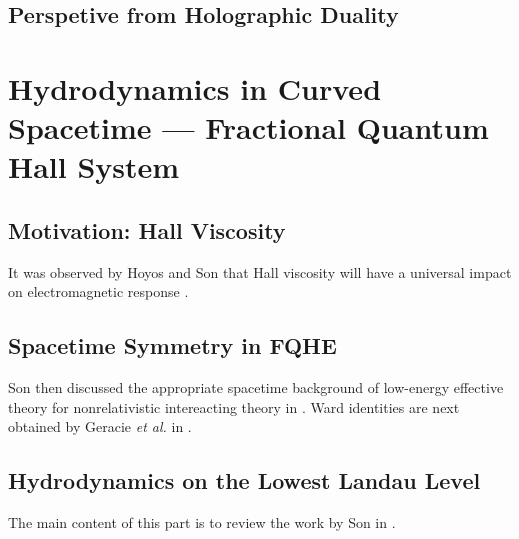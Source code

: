 \documentclass[10pt,nofootinbib]{revtex4}
\begin{document}
	\subsection{Perspetive from Holographic Duality}

\section{Hydrodynamics in Curved Spacetime --- Fractional Quantum Hall System}
	\subsection{Motivation: Hall Viscosity}
		It was observed by Hoyos and Son that Hall viscosity will have a universal impact on electromagnetic response \cite{hoyos2012hall}.
	\subsection{Spacetime Symmetry in FQHE}
		Son then discussed the appropriate spacetime background of low-energy effective theory for nonrelativistic intereacting theory in \cite{son2013newton}. Ward identities are next obtained by Geracie {\it et al.} in \cite{geracie2015spacetime}.

	\subsection{Hydrodynamics on the Lowest Landau Level}
		The main content of this part is to review the work by Son in \cite{geracie2015hydrodynamics}.


\end{document}
